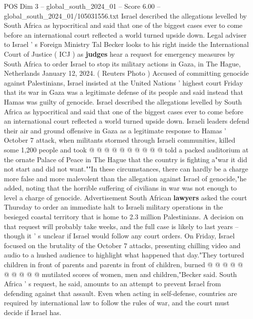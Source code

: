 \begin{textsample}{POS Dim 3 – global\_south\_2024\_01 – Score 6.00 – global\_south\_2024\_01/105031556.txt}  \label{ex:f3_pos_354}
Israel described the allegations levelled by South Africa as hypocritical and said that one of the biggest cases ever to come before an international court reflected a world turned upside down.
Legal adviser to Israel ' s Foreign Ministry Tal Becker looks to his right inside the International Court of Justice ( ICJ ) as \textbf{judges} hear a request for emergency measures by South Africa to order Israel to stop its military actions in Gaza, in The Hague, Netherlands January 12, 2024. ( Reuters Photo ) Accused of committing genocide against Palestinians, Israel insisted at the United Nations ' highest court Friday that its war in Gaza was a legitimate defense of its people and said instead that Hamas was guilty of genocide.
Israel described the allegations levelled by South Africa as hypocritical and said that one of the biggest cases ever to come before an international court reflected a world turned upside down.
Israeli leaders defend their air and ground offensive in Gaza as a legitimate response to Hamas ' October 7 attack, when militants stormed through Israeli communities, killed some 1,200 people and took @ @ @ @ @ @ @ @ @ @ told a packed auditorium at the ornate Palace of Peace in The Hague that the country is fighting a"war it did not start and did not want.""In these circumstances, there can hardly be a charge more false and more malevolent than the allegation against Israel of genocide,"he added, noting that the horrible suffering of civilians in war was not enough to level a charge of genocide.
Advertisement South African \textbf{lawyers} asked the court Thursday to order an immediate halt to Israeli military operations in the besieged coastal territory that is home to 2.3 million Palestinians.
A decision on that request will probably take weeks, and the full case is likely to last years -- though it ' s unclear if Israel would follow any court orders.
On Friday, Israel focused on the brutality of the October 7 attacks, presenting chilling video and audio to a hushed audience to highlight what happened that day."They tortured children in front of parents and parents in front of children, burned @ @ @ @ @ @ @ @ @ @ mutilated scores of women, men and children,"Becker said.
South Africa ' s request, he said, amounts to an attempt to prevent Israel from defending against that assault.
Even when acting in self-defense, countries are required by international law to follow the rules of war, and the court must decide if Israel has.

\end{textsample}
